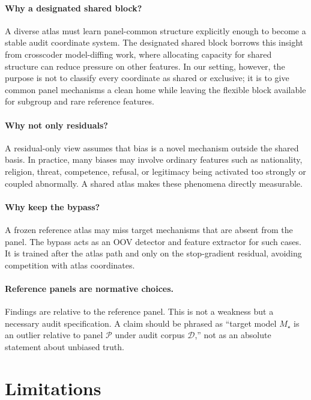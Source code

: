 \documentclass[11pt]{article}
\newcommand{\panel}{\mathcal{P}}
\newcommand{\target}{M_\star}
\begin{document}
\paragraph{Why a designated shared block?}
A diverse atlas must learn panel-common structure explicitly enough to become a stable audit coordinate system. The designated shared block borrows this insight from crosscoder model-diffing work, where allocating capacity for shared structure can reduce pressure on other features. In our setting, however, the purpose is not to classify every coordinate as shared or exclusive; it is to give common panel mechanisms a clean home while leaving the flexible block available for subgroup and rare reference features.

\paragraph{Why not only residuals?}
A residual-only view assumes that bias is a novel mechanism outside the shared basis. In practice, many biases may involve ordinary features such as nationality, religion, threat, competence, refusal, or legitimacy being activated too strongly or coupled abnormally. A shared atlas makes these phenomena directly measurable.

\paragraph{Why keep the bypass?}
A frozen reference atlas may miss target mechanisms that are absent from the panel. The bypass acts as an OOV detector and feature extractor for such cases. It is trained after the atlas path and only on the stop-gradient residual, avoiding competition with atlas coordinates.

\paragraph{Reference panels are normative choices.}
Findings are relative to the reference panel. This is not a weakness but a necessary audit specification. A claim should be phrased as ``target model $\target$ is an outlier relative to panel $\panel$ under audit corpus $\mathcal{D}$,'' not as an absolute statement about unbiased truth.

\section{Limitations}
\end{document}
